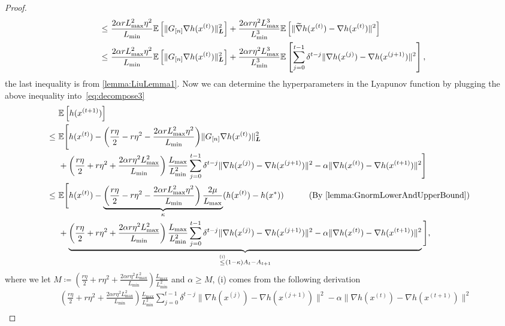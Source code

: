 \begin{proof}
\begin{align*}
        ~\leq~&  \frac{2 \alpha r L_{\max}^2 \eta^2}{L_{\min}} \mathbb{E} \left[ \| G_{[n]} \nabla h( x^{(t)} ) \|^2_{\boldsymbol{L}} \right] + \frac{2 \alpha r \eta^2 L_{\max}^3}{ L_{\min}^3 } \mathbb{E} \left[  \| \widetilde{\nabla} h( x^{(t)} ) - \nabla h( x^{(t)} ) \|^2  \right] \\
        ~\leq~& \frac{2 \alpha r L_{\max}^2 \eta^2}{L_{\min}} \mathbb{E} \left[ \| G_{[n]} \nabla h( x^{(t)} ) \|^2_{\boldsymbol{L}} \right] + \frac{2 \alpha r \eta^2 L_{\max}^3 }{ L_{\min}^3 }  \mathbb{E} \left[ \sum_{j=0}^{t-1} \delta^{t-j} \| \nabla h(x^{(j)}) - {\nabla} h(x^{(j+1)}) \|^2 \right],
    \end{align*}
    the last inequality is from \autoref{lemma:LiuLemma1}.
    Now we can determine the hyperparameters in the Lyapunov function by plugging the above inequality into~\autoref{eq:decompose3} 
    \begin{align}
        &\mE\left[ h(x^{(t+1)}) \right] \nonumber \\
        ~\leq~& \mE\Bigg[ h(x^{(t)}) - {\left( \frac{r \eta }{2} - r \eta^2 - \frac{2 \alpha r L_{\max}^2 \eta^2}{L_{\min}} \right)} \| G_{[n]} \nabla h(x^{(t)}) \|_{\bL}^2  \nonumber \\
        &+ {\left( \frac{r \eta}{2} + r \eta^2 + \frac{2 \alpha r \eta^2 L_{\max}^2}{ L_{\min} } \right) \frac{L_{\max}}{L_{\min}^2} \sum_{j=0}^{t-1} \delta^{t-j} \| \nabla h(x^{(j)}) - {\nabla} h(x^{(j+1)}) \|^2 - \alpha \| \nabla h(x^{(t)}) - {\nabla} h(x^{(t+1)}) \|^2} \Bigg]  \nonumber \\
        ~\leq~& \mE\Bigg[ h(x^{(t)}) - \underbrace{\left( \frac{r \eta }{2} - r \eta^2 - \frac{2 \alpha r L_{\max}^2 \eta^2}{L_{\min}} \right) \frac{2\mu}{ L_{\max}} }_{\kappa} ( h(x^{(t)}) - h(x^*) ) \qquad \text{(By~\autoref{lemma:GnormLowerAndUpperBound})} \nonumber \\
        &+ \underbrace{\left( \frac{r \eta}{2} + r \eta^2 + \frac{2 \alpha r \eta^2 L_{\max}^2}{ L_{\min} } \right) \frac{L_{\max}}{L_{\min}^2} \sum_{j=0}^{t-1} \delta^{t-j} \| \nabla h(x^{(j)}) - {\nabla} h(x^{(j+1)}) \|^2 - \alpha \| \nabla h(x^{(t)}) - {\nabla} h(x^{(t+1)}) \|^2}_{ \overset{\rm{(i)}}{\leq} (1 - \kappa) A_t - A_{t+1}} \Bigg],  \label{eq:recursion}
    \end{align}
    where we let $M \coloneqq \left( \frac{r \eta}{2} + r \eta^2 + \frac{2 \alpha r \eta^2 L_{\max}^2}{ L_{\min} } \right) \frac{L_{\max}}{L_{\min}^2}$ and $\alpha \geq M$, (i) comes from the following derivation
    \begin{align*}
        &\left( \frac{r \eta}{2} + r \eta^2 + \frac{2 \alpha r \eta^2 L_{\max}^2}{ L_{\min} } \right) \frac{L_{\max}}{L_{\min}^2} \sum_{j=0}^{t-1} \delta^{t-j} \| \nabla h(x^{(j)}) - {\nabla} h(x^{(j+1)}) \|^2 - \alpha \| \nabla h(x^{(t)}) - {\nabla} h(x^{(t+1)}) \|^2 \\

\end{align*}
\end{proof}
